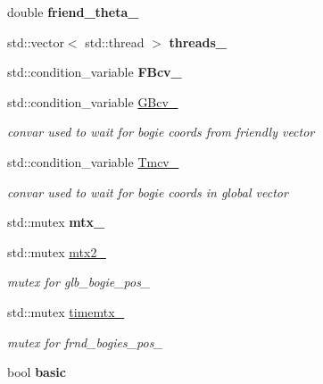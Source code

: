 \begin{DoxyCompactItemize}
\mbox{\label{classBogiepos_af473d776c1ed9edf9f1d8af85cd9ac35}} 
double {\bfseries friend\+\_\+theta\+\_\+}
\item 
\mbox{\label{classBogiepos_afb4793bea74a5b442242b16ccb58adef}} 
std\+::vector$<$ std\+::thread $>$ {\bfseries threads\+\_\+}
\item 
\mbox{\label{classBogiepos_aa4832d973bd9e51a759625d729a096c1}} 
std\+::condition\+\_\+variable {\bfseries F\+Bcv\+\_\+}
\item 
\mbox{\label{classBogiepos_a3c8228b9a0707d799b954f522c5e31ba}} 
std\+::condition\+\_\+variable \hyperlink{classBogiepos_a3c8228b9a0707d799b954f522c5e31ba}{G\+Bcv\+\_\+}
\begin{DoxyCompactList}\small\item\em convar used to wait for bogie coords from friendly vector \end{DoxyCompactList}\item 
\mbox{\label{classBogiepos_ac0860e78ea88ffa0ac9d52166c59136e}} 
std\+::condition\+\_\+variable \hyperlink{classBogiepos_ac0860e78ea88ffa0ac9d52166c59136e}{Tmcv\+\_\+}
\begin{DoxyCompactList}\small\item\em convar used to wait for bogie coords in global vector \end{DoxyCompactList}\item 
\mbox{\label{classBogiepos_abfabc136eb8055dd32de540f6049c866}} 
std\+::mutex {\bfseries mtx\+\_\+}
\item 
\mbox{\label{classBogiepos_a2726af1b3d3733b562e02e0a8693c5c3}} 
std\+::mutex \hyperlink{classBogiepos_a2726af1b3d3733b562e02e0a8693c5c3}{mtx2\+\_\+}
\begin{DoxyCompactList}\small\item\em mutex for glb\+\_\+bogie\+\_\+pos\+\_\+ \end{DoxyCompactList}\item 
\mbox{\label{classBogiepos_a002263aed53cb021c2a296b06f92a4f4}} 
std\+::mutex \hyperlink{classBogiepos_a002263aed53cb021c2a296b06f92a4f4}{timemtx\+\_\+}
\begin{DoxyCompactList}\small\item\em mutex for frnd\+\_\+bogies\+\_\+pos\+\_\+ \end{DoxyCompactList}\item 
\mbox{\label{classBogiepos_afb0fe54a6c6801619e2ae3560c5be15d}} 
bool {\bfseries basic}
\end{DoxyCompactItemize}


